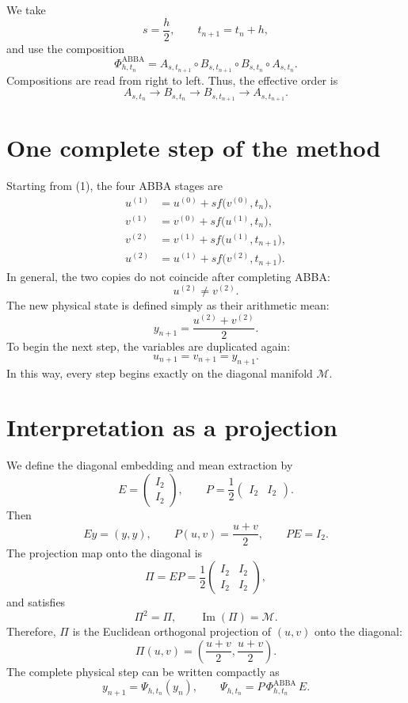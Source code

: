 \documentclass[11pt,a4paper]{article}
\newcommand{\Id}{I}
\newcommand{\M}{\mathcal{M}}
\newcommand{\PhiAB}{\Phi^{\mathrm{ABBA}}_{h,t_n}}
\begin{document}
We take
\[
 s=\frac h2,
 \qquad
 t_{n+1}=t_n+h,
\]
and use the composition
\[
 \boxed{
 \PhiAB
 =A_{s,t_{n+1}}
  \circ B_{s,t_{n+1}}
  \circ B_{s,t_n}
  \circ A_{s,t_n}.
 } \tag{4}
\]
Compositions are read from right to left. Thus, the effective order is
\[
 A_{s,t_n}\longrightarrow B_{s,t_n}
 \longrightarrow B_{s,t_{n+1}}\longrightarrow A_{s,t_{n+1}}.
\]

\section{One complete step of the method}

Starting from (1), the four ABBA stages are
\begin{align}
 u^{(1)}
 &=u^{(0)}+s f\bigl(v^{(0)},t_n\bigr), \tag{5a}\\
 v^{(1)}
 &=v^{(0)}+s f\bigl(u^{(1)},t_n\bigr), \tag{5b}\\
 v^{(2)}
 &=v^{(1)}+s f\bigl(u^{(1)},t_{n+1}\bigr), \tag{5c}\\
 u^{(2)}
 &=u^{(1)}+s f\bigl(v^{(2)},t_{n+1}\bigr). \tag{5d}
\end{align}
In general, the two copies do not coincide after completing ABBA:
\[
 u^{(2)}\neq v^{(2)}.
\]
The new physical state is defined simply as their arithmetic mean:
\[
 \boxed{
 y_{n+1}=\frac{u^{(2)}+v^{(2)}}{2}.
 } \tag{6}
\]
To begin the next step, the variables are duplicated again:
\[
 \boxed{
 u_{n+1}=v_{n+1}=y_{n+1}.
 } \tag{7}
\]
In this way, every step begins exactly on the diagonal manifold \(\M\).

\section{Interpretation as a projection}

We define the diagonal embedding and mean extraction by
\[
 E=
 \begin{pmatrix}
  \Id_2\\ \Id_2
 \end{pmatrix},
 \qquad
 P=\frac12
 \begin{pmatrix}
  \Id_2&\Id_2
 \end{pmatrix}.
\]
Then
\[
 Ey=(y,y),
 \qquad
 P(u,v)=\frac{u+v}{2},
 \qquad
 PE=\Id_2.
\]
The projection map onto the diagonal is
\[
 \Pi=EP
 =\frac12
 \begin{pmatrix}
  \Id_2&\Id_2\\
  \Id_2&\Id_2
 \end{pmatrix},
\]
and satisfies
\[
 \Pi^2=\Pi,
 \qquad
 \operatorname{Im}(\Pi)=\M.
\]
Therefore, \(\Pi\) is the Euclidean orthogonal projection of \((u,v)\) onto the diagonal:
\[
 \Pi(u,v)
 =\left(\frac{u+v}{2},\frac{u+v}{2}\right).
\]
The complete physical step can be written compactly as
\[
 \boxed{
 y_{n+1}=\Psi_{h,t_n}(y_n),
 \qquad
 \Psi_{h,t_n}=P\,\PhiAB\,E.
 } \tag{8}
\]
\end{document}
